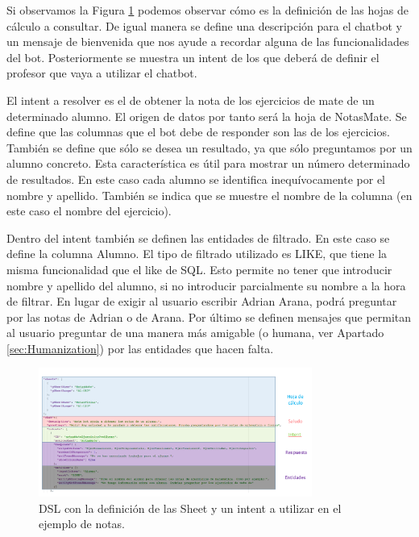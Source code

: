 Si observamos la Figura \ref{fig:DSLNotas} podemos observar cómo es la definición de las hojas de cálculo a consultar. De igual manera se define una descripción para el chatbot y un mensaje de bienvenida que nos ayude a recordar alguna de las funcionalidades del bot. Posteriormente se muestra un intent de los que deberá de definir el profesor que vaya a utilizar el chatbot.

El intent a resolver es el de obtener la nota de los ejercicios de mate de un determinado alumno. El origen de datos por tanto será la hoja de NotasMate. Se define que las columnas que el bot debe de responder son las de los ejercicios. También se define que sólo se desea un resultado, ya que sólo preguntamos por un alumno concreto. Esta característica es útil para mostrar un número determinado de resultados. En este caso cada alumno se identifica inequívocamente por el nombre y apellido. También se indica que se muestre el nombre de la columna (en este caso el nombre del ejercicio).

Dentro del intent también se definen las entidades de filtrado. En este caso se define la columna Alumno. El tipo de filtrado utilizado es LIKE, que tiene la misma funcionalidad que el like de SQL. Esto permite no tener que introducir nombre y apellido del alumno, si no introducir parcialmente su nombre a la hora de filtrar. En lugar de exigir al usuario escribir Adrian Arana, podrá preguntar por las notas de Adrian o de Arana. Por último se definen mensajes que permitan al usuario preguntar de una manera más amigable (o humana, ver Apartado \ref{sec:Humanization}) por las entidades que hacen falta.

\begin{figure}[htb]
	\centering
	\includegraphics[width=0.8\textwidth]{./figs/DSLNotas.png}
	\caption{DSL con la definición de las Sheet y un intent a utilizar en el ejemplo de notas.} %
	\label{fig:DSLNotas}
\end{figure}


